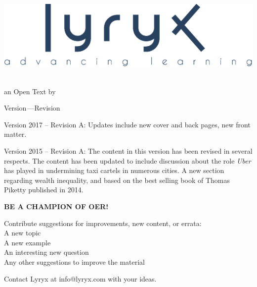 \setcounter{page}{1}
\thispagestyle{empty}
\vspace{-3em}
\begin{center}
	\includegraphics[width=.4\textwidth]{images/LyryxLogo.eps}
\end{center}

\vspace{-2em}

\begin{center}
 {\fontsize{24pt}{22pt}\selectfont \textcolor{titletextcolour}{\booktitle}} \\ [.3\baselineskip]
{\fontsize{16pt}{20pt}\selectfont \textcolor{cctextcolour}{an Open Text}} {\fontsize{16pt}{20pt}\selectfont\textcolor{cctextcolour}{ by \bookauthor}}

\smallskip

 {\fontsize{16pt}{20pt}\selectfont\textcolor{cctextcolour}{Version\,\version \enskip---\enskip Revision\,\revision}} 
\end{center}

\setlength{\parskip}{0pt}

\textcolor{cctextcolour}{Version 2017 -- Revision A}: Updates include new cover and back pages, new front matter. 

\medskip

\textcolor{cctextcolour}{Version 2015 -- Revision A}: The content in this version has been revised in several respects. The content has been updated to include discussion about the role \textit{Uber} has played in undermining taxi cartels in numerous cities. A new section regarding wealth inequality, and based on the best selling book of Thomas Piketty published in 2014.
\vspace{3em}


\begin{center} 
\fontsize{14pt}{16pt}\selectfont\textcolor{cctextcolour}{\textbf{BE A CHAMPION OF OER!}}
\end{center}

\begin{center}
Contribute suggestions for improvements, new content, or errata: \\
A new topic \\
A new example \\
An interesting new question \\
Any other suggestions to improve the material

\medskip

\noindent Contact Lyryx at \textcolor{cctextcolour}{info@lyryx.com} with your ideas.
\end{center}

